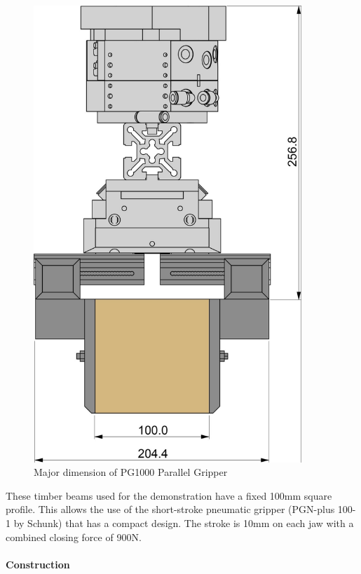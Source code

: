 \begin{figure}
    \centering
    \includegraphics[width=0.90\textwidth]{images/05/image87.jpg}
    \caption{Major dimension of PG1000 Parallel Gripper}
    \label{fig:rendering-pg1000-dimension}
\end{figure}

These timber beams used for the demonstration have a fixed 100mm square profile. This allows the use of the short-stroke pneumatic gripper (PGN-plus 100-1 by Schunk) that has a compact design. The stroke is 10mm on each jaw with a combined closing force of 900N. 

\paragraph{Construction}

